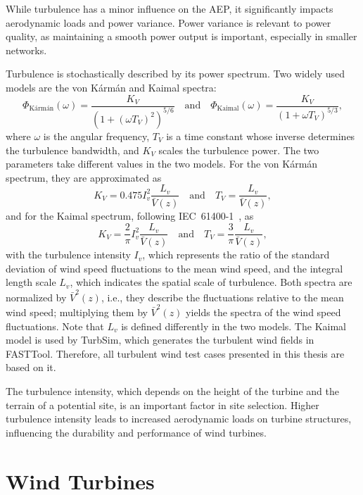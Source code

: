 While turbulence has a minor influence on the AEP, it significantly impacts aerodynamic loads and power variance. Power variance is relevant to power quality, as maintaining a smooth power output is important, especially in smaller networks.

Turbulence is stochastically described by its power spectrum. Two widely used models are the von K\'arm\'an and Kaimal spectra:
\begin{equation}
    \Phi_{\text{K\'arm\'an}}(\omega) = \frac{K_V}{(1 +(\omega T_V)^2)^{5/6}} \quad \text{and} \quad
    \Phi_{\text{Kaimal}}(\omega) = \frac{K_V}{(1 +\omega T_V)^{5/3}},
\end{equation}
where $\omega$ is the angular frequency, $T_V$ is a time constant whose inverse determines the turbulence bandwidth, and $K_V$ scales the turbulence power. The two parameters take different values in the two models. For the von K\'arm\'an spectrum, they are approximated as~\cite{Bianchi2007}
\begin{equation}
    K_V = 0.475 I_v^2 \frac{L_v}{\bar{V}(z)} \quad \text{and} \quad T_V = \frac{L_v}{\bar{V}(z)},
\end{equation}
and for the Kaimal spectrum, following IEC~61400-1~\cite{IEC61400-1}, as
\begin{equation}
    K_V = \frac{2}{\pi} I_v^2 \frac{L_v}{\bar{V}(z)} \quad \text{and} \quad T_V = \frac{3}{\pi}\frac{L_v}{\bar{V}(z)},
\end{equation}
with the turbulence intensity $I_v$, which represents the ratio of the standard deviation of wind speed fluctuations to the mean wind speed, and the integral length scale $L_v$, which indicates the spatial scale of turbulence. Both spectra are normalized by $\bar{V}^2(z)$, i.e., they describe the fluctuations relative to the mean wind speed; multiplying them by $\bar{V}^2(z)$ yields the spectra of the wind speed fluctuations. Note that $L_v$ is defined differently in the two models. The Kaimal model is used by TurbSim, which generates the turbulent wind fields in FASTTool. Therefore, all turbulent wind test cases presented in this thesis are based on it.


The turbulence intensity, which depends on the height of the turbine and the terrain of a potential site, is an important factor in site selection. Higher turbulence intensity leads to increased aerodynamic loads on turbine structures, influencing the durability and performance of wind turbines.

\section{Wind Turbines} \label{sec:WindTurbines}

